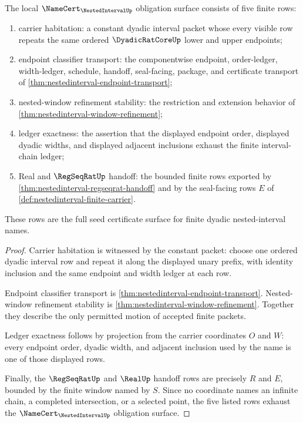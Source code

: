 \begin{theorem}
\label{thm:nestedinterval-namecert-obligation-surface}
The local $\NameCert_{\NestedIntervalUp}$ obligation surface consists of five finite rows:
\begin{enumerate}
\item carrier habitation: a constant dyadic interval packet whose every visible row repeats the same ordered $\DyadicRatCoreUp$ lower and upper endpoints;
\item endpoint classifier transport: the componentwise endpoint, order-ledger, width-ledger, schedule, handoff, seal-facing, package, and certificate transport of \autoref{thm:nestedinterval-endpoint-transport};
\item nested-window refinement stability: the restriction and extension behavior of \autoref{thm:nestedinterval-window-refinement};
\item ledger exactness: the assertion that the displayed endpoint order, displayed dyadic widths, and displayed adjacent inclusions exhaust the finite interval-chain ledger;
\item Real and $\RegSeqRatUp$ handoff: the bounded finite rows exported by \autoref{thm:nestedinterval-regseqrat-handoff} and by the seal-facing rows $E$ of \autoref{def:nestedinterval-finite-carrier}.
\end{enumerate}
These rows are the full seed certificate surface for finite dyadic nested-interval names.
\end{theorem}
\begin{proof}
Carrier habitation is witnessed by the constant packet: choose one ordered dyadic interval row and repeat it along the displayed unary prefix, with identity inclusion and the same endpoint and width ledger at each row.

Endpoint classifier transport is \autoref{thm:nestedinterval-endpoint-transport}. Nested-window refinement stability is \autoref{thm:nestedinterval-window-refinement}. Together they describe the only permitted motion of accepted finite packets.

Ledger exactness follows by projection from the carrier coordinates $O$ and $W$: every endpoint order, dyadic width, and adjacent inclusion used by the name is one of those displayed rows.

Finally, the $\RegSeqRatUp$ and $\RealUp$ handoff rows are precisely $R$ and $E$, bounded by the finite window named by $S$. Since no coordinate names an infinite chain, a completed intersection, or a selected point, the five listed rows exhaust the $\NameCert_{\NestedIntervalUp}$ obligation surface.
\end{proof}

